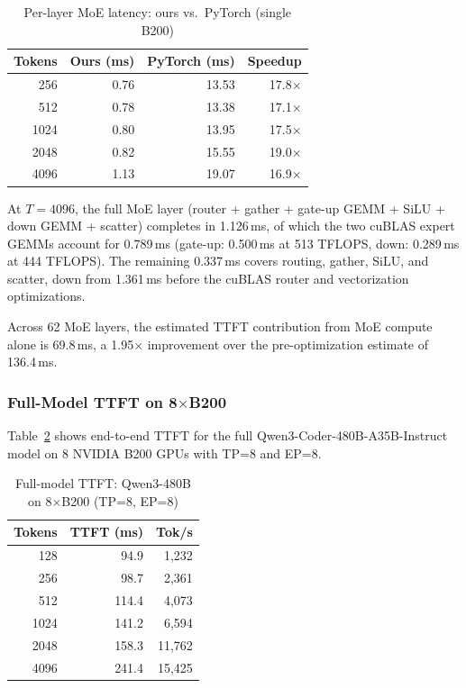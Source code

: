 \documentclass[sigplan,screen]{acmart}
\begin{document}
\begin{table}[h]
  \caption{Per-layer MoE latency: ours vs.\ PyTorch (single B200)}
  \label{tab:moe-kernel}
  \small
  \begin{tabular}{rrrr}
    \toprule
    Tokens & Ours (ms) & PyTorch (ms) & Speedup \\
    \midrule
    256  & 0.76 & 13.53 & 17.8$\times$ \\
    512  & 0.78 & 13.38 & 17.1$\times$ \\
    1024 & 0.80 & 13.95 & 17.5$\times$ \\
    2048 & 0.82 & 15.55 & 19.0$\times$ \\
    4096 & 1.13 & 19.07 & 16.9$\times$ \\
    \bottomrule
  \end{tabular}
\end{table}

At $T{=}4096$, the full MoE layer (router + gather + gate-up GEMM + SiLU + down GEMM + scatter) completes in 1.126\,ms, of which the two cuBLAS expert GEMMs account for 0.789\,ms (gate-up: 0.500\,ms at 513 TFLOPS, down: 0.289\,ms at 444 TFLOPS). The remaining 0.337\,ms covers routing, gather, SiLU, and scatter, down from 1.361\,ms before the cuBLAS router and vectorization optimizations.

Across 62 MoE layers, the estimated TTFT contribution from MoE compute alone is 69.8\,ms, a 1.95$\times$ improvement over the pre-optimization estimate of 136.4\,ms.

\subsubsection{Full-Model TTFT on 8$\times$B200}

Table~\ref{tab:moe-ttft} shows end-to-end TTFT for the full Qwen3-Coder-480B-A35B-Instruct model on 8 NVIDIA B200 GPUs with TP=8 and EP=8.

\begin{table}[h]
  \caption{Full-model TTFT: Qwen3-480B on 8$\times$B200 (TP=8, EP=8)}
  \label{tab:moe-ttft}
  \small
  \begin{tabular}{rrr}
    \toprule
    Tokens & TTFT (ms) & Tok/s \\
    \midrule
    128  &  94.9 &  1{,}232 \\
    256  &  98.7 &  2{,}361 \\
    512  & 114.4 &  4{,}073 \\
    1024 & 141.2 &  6{,}594 \\
    2048 & 158.3 & 11{,}762 \\
    4096 & 241.4 & 15{,}425 \\
    \bottomrule
  \end{tabular}
\end{table}
\end{document}
